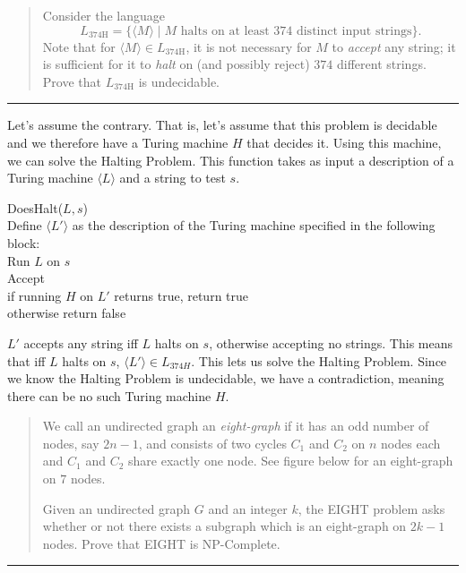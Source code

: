 \documentclass[11pt]{article}
\begin{document}



\begin{quote}
Consider the language $$L_{\text{374H}} = \{ \langle M\rangle
      \mid M \text{~halts on at least 374 distinct input strings}\}.$$ Note that
      for $\langle M\rangle \in L_{\text{374H}}$, it is not necessary
      for $M$ to {\em accept} any string; it is sufficient for it to
      {\em halt} on (and possibly reject) $374$ different strings. Prove that
      $L_{\text{374H}}$ is undecidable.
\end{quote}
\hrule



\begin{solution}
    Let's assume the contrary. That is, let's assume that this problem is decidable and we therefore have a Turing machine $H$ that decides it. 
    Using this machine, we can solve the Halting Problem. This function takes as input a description of a Turing machine $\langle L \rangle$ and a string to
    test $s$.
    \begin{algo}
        DoesHalt($L, s$) \+
        \\ Define $\langle L' \rangle$ as the description of the Turing machine specified in the following block: \+
        \\ Run $L$ on $s$
        \\ Accept \-
        \\ if running $H$ on $L'$ returns true, return true
        \\ otherwise return false
    \end{algo}
    $L'$ accepts any string iff $L$ halts on $s$, otherwise accepting no strings. This means that iff $L$ halts on $s$, $\langle L' \rangle \in L_{374H}$. This lets us solve the Halting Problem. Since we know the Halting Problem is undecidable, we have a contradiction, meaning there can be no such Turing machine $H$. 
\end{solution}


\begin{quote}
We call an undirected graph an \emph{eight-graph} if it has
      an odd number of nodes, say $2n-1$, and consists of two cycles
      $C_1$ and $C_2$ on $n$ nodes each and $C_1$ and $C_2$ share
      exactly one node. See figure below for an eight-graph on $7$
      nodes.

  Given an undirected graph $G$ and an integer $k$, the EIGHT
  problem asks whether or not there exists a subgraph which is an eight-graph
  on $2k-1$ nodes. Prove that EIGHT is NP-Complete.
\end{quote}
\hrule
\end{document}
